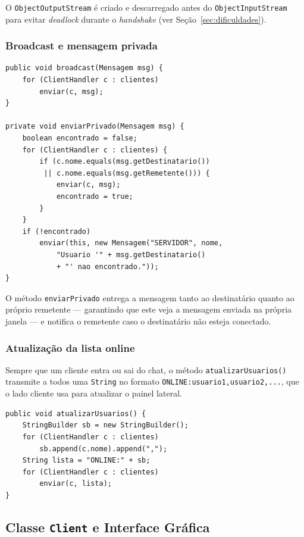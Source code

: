 \documentclass[10pt,twocolumn,a4paper]{article}
\begin{document}
O \texttt{ObjectOutputStream} é criado e descarregado antes do
\texttt{ObjectInputStream} para evitar \textit{deadlock} durante o
\textit{handshake} (ver Seção~\ref{sec:dificuldades}).

\subsubsection{Broadcast e mensagem privada}

\begin{lstlisting}[caption={Broadcast e envio privado}]
public void broadcast(Mensagem msg) {
    for (ClientHandler c : clientes)
        enviar(c, msg);
}

private void enviarPrivado(Mensagem msg) {
    boolean encontrado = false;
    for (ClientHandler c : clientes) {
        if (c.nome.equals(msg.getDestinatario())
         || c.nome.equals(msg.getRemetente())) {
            enviar(c, msg);
            encontrado = true;
        }
    }
    if (!encontrado)
        enviar(this, new Mensagem("SERVIDOR", nome,
            "Usuario '" + msg.getDestinatario()
            + "' nao encontrado."));
}
\end{lstlisting}

O método \texttt{enviarPrivado} entrega a mensagem tanto ao destinatário quanto
ao próprio remetente — garantindo que este veja a mensagem enviada na própria
janela — e notifica o remetente caso o destinatário não esteja conectado.

\subsubsection{Atualização da lista online}

Sempre que um cliente entra ou sai do chat, o método
\texttt{atualizarUsuarios()} transmite a todos uma \texttt{String} no formato
\texttt{ONLINE:usuario1,usuario2,...}, que o lado cliente usa para atualizar o
painel lateral.

\begin{lstlisting}[caption={Envio da lista de usuários online}]
public void atualizarUsuarios() {
    StringBuilder sb = new StringBuilder();
    for (ClientHandler c : clientes)
        sb.append(c.nome).append(",");
    String lista = "ONLINE:" + sb;
    for (ClientHandler c : clientes)
        enviar(c, lista);
}
\end{lstlisting}

\subsection{Classe \texttt{Client} e Interface Gráfica}
\end{document}
